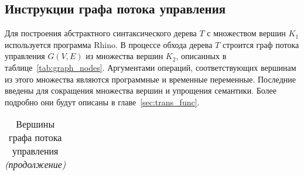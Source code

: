 \subsection{Инструкции графа потока управления}%
\label{sec:cfgbuild}
Для построения абстрактного синтаксического дерева $T$ с множеством
вершин $K_1$ используется программа Rhino\cite{rhino}. В процессе
обхода дерева $T$ строится граф потока управления $G(V, E)$ из
множества вершин $K_2$, описанных в таблице~\ref{tab:graph_nodes}.
Аргументами операций, соответствующих вершинам из этого множества
являются программные и временные переменные. Последние введены для
сокращения множества вершин и упрощения семантики. Более подробно они
будут описаны в главе~\ref{sec:trans_func}.
\begin{center}
  \begin{longtable}{|>{\small\ttfamily}p{5cm}p{10cm}|}
    \caption{Вершины графа потока управления}
    \\[\smallskipamount]\hline 
  \endfirsthead
    \caption{Вершины графа потока управления \emph{(продолжение)}}
    \\[\smallskipamount]\hline 
  \endhead
    \hline


\end{longtable}
\end{center}
